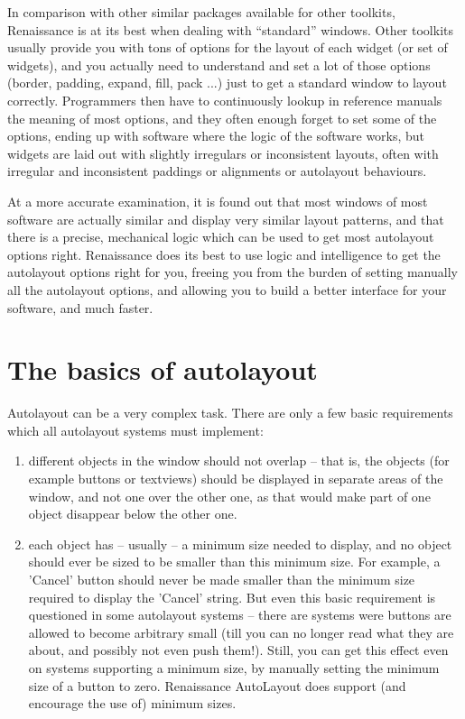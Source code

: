 In comparison with other similar packages available for other
toolkits, Renaissance is at its best when dealing with ``standard''
windows.  Other toolkits usually provide you with tons of options for
the layout of each widget (or set of widgets), and you actually need
to understand and set a lot of those options (border, padding, expand,
fill, pack ...) just to get a standard window to layout correctly.
Programmers then have to continuously lookup in reference manuals the
meaning of most options, and they often enough forget to set some of
the options, ending up with software where the logic of the software
works, but widgets are laid out with slightly irregulars or
inconsistent layouts, often with irregular and inconsistent paddings or
alignments or autolayout behaviours.

At a more accurate examination, it is found out that most windows of
most software are actually similar and display very similar layout
patterns, and that there is a precise, mechanical logic which can be
used to get most autolayout options right.  Renaissance does its best to
use logic and intelligence to get the autolayout options right for
you, freeing you from the burden of setting manually all the
autolayout options, and allowing you to build a better interface for
your software, and much faster.


\section{The basics of autolayout}
Autolayout can be a very complex task.  There are only a few basic
requirements which all autolayout systems must implement:
\begin{enumerate}

\item different objects in the window should not overlap -- that is, 
the objects (for example buttons or textviews) should be displayed in
separate areas of the window, and not one over the other one, as that
would make part of one object disappear below the other one.

\item each object has -- usually -- a minimum size needed to display, 
and no object should ever be sized to be smaller than this minimum
size.  For example, a 'Cancel' button should never be made smaller
than the minimum size required to display the 'Cancel' string.  But
even this basic requirement is questioned in some autolayout systems
-- there are systems were buttons are allowed to become arbitrary
small (till you can no longer read what they are about, and possibly
not even push them!).  Still, you can get this effect even on systems
supporting a minimum size, by manually setting the minimum size of a
button to zero.  Renaissance AutoLayout does support (and encourage
the use of) minimum sizes.
\end{enumerate}

